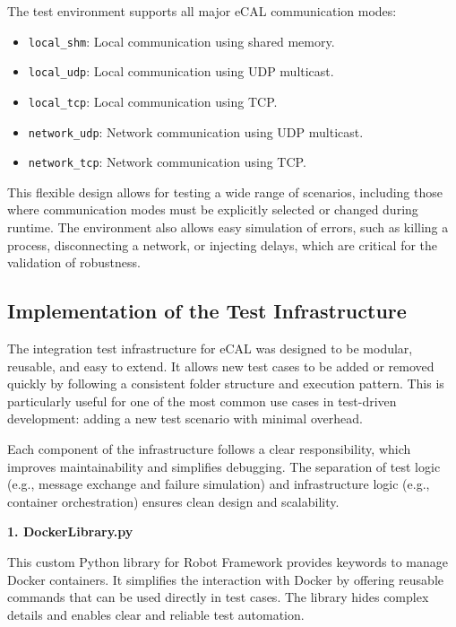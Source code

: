 The test environment supports all major eCAL communication modes:

\begin{itemize}
	\item \texttt{local\_shm}: Local communication using shared memory.
	\item \texttt{local\_udp}: Local communication using UDP multicast.
	\item \texttt{local\_tcp}: Local communication using TCP.
	\item \texttt{network\_udp}: Network communication using UDP multicast.
	\item \texttt{network\_tcp}: Network communication using TCP.\\
\end{itemize}

This flexible design allows for testing a wide range of scenarios, including those where communication modes must be explicitly selected or changed during runtime. The environment also allows easy simulation of errors, such as killing a process, disconnecting a network, or injecting delays, which are critical for the validation of robustness.

\subsection{Implementation of the Test Infrastructure}

The integration test infrastructure for eCAL was designed to be modular, reusable, and easy to extend. It allows new test cases to be added or removed quickly by following a consistent folder structure and execution pattern. This is particularly useful for one of the most common use cases in test-driven development: adding a new test scenario with minimal overhead.

\vspace{0.5em}
Each component of the infrastructure follows a clear responsibility, which improves maintainability and simplifies debugging. The separation of test logic (e.g., message exchange and failure simulation) and infrastructure logic (e.g., container orchestration) ensures clean design and scalability.

\vspace{1em}
\textbf{1. DockerLibrary.py}

\vspace{0.3em}
This custom Python library for Robot Framework provides keywords to manage Docker containers. It simplifies the interaction with Docker by offering reusable commands that can be used directly in test cases. The library hides complex details and enables clear and reliable test automation.

